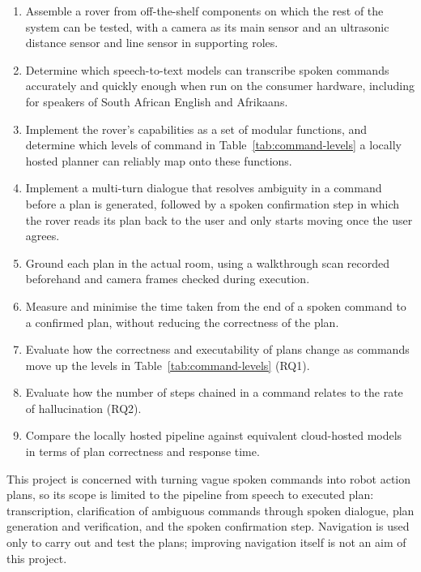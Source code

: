 \begin{enumerate}
    \item Assemble a rover from off-the-shelf components on which the rest of the system can be
        tested, with a camera as its main sensor and an ultrasonic distance sensor and line
        sensor in supporting roles.
    \item Determine which speech-to-text models can transcribe spoken commands accurately and
        quickly enough when run on the consumer hardware, including for speakers of South
        African English and Afrikaans.
    \item Implement the rover's capabilities as a set of modular functions, and determine which
        levels of command in Table~\ref{tab:command-levels} a locally hosted planner can
        reliably map onto these functions.
    \item Implement a multi-turn dialogue that resolves ambiguity in a command before a plan is
        generated, followed by a spoken confirmation step in which the rover reads its plan back
        to the user and only starts moving once the user agrees.
    \item Ground each plan in the actual room, using a walkthrough scan recorded beforehand and
        camera frames checked during execution.
    \item Measure and minimise the time taken from the end of a spoken command to a confirmed
        plan, without reducing the correctness of the plan.
    \item Evaluate how the correctness and executability of plans change as commands move up
        the levels in Table~\ref{tab:command-levels} (RQ1).
    \item Evaluate how the number of steps chained in a command relates to the rate of
        hallucination (RQ2).
    \item Compare the locally hosted pipeline against equivalent cloud-hosted models in terms of
        plan correctness and response time.
\end{enumerate}

\label{sec:scope-and-limitations}

This project is concerned with turning vague spoken commands into robot action plans, so its
scope is limited to the pipeline from speech to executed plan: transcription, clarification of
ambiguous commands through spoken dialogue, plan generation and verification, and the spoken
confirmation step. Navigation is used only to carry out and test the plans; improving
navigation itself is not an aim of this project.

